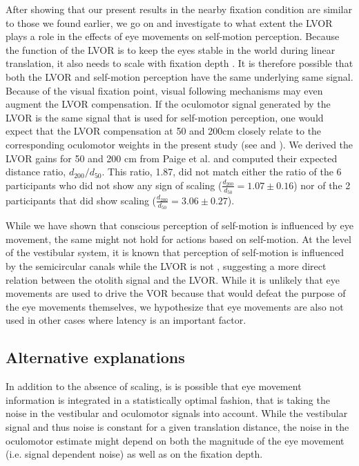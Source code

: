 After showing that our present results in the nearby fixation condition are similar to those we found earlier, we go on and investigate to what extent the LVOR plays a role in the effects of eye movements on self-motion perception. Because the function of the LVOR is to keep the eyes stable in the world during linear translation, it also needs to scale with fixation depth \cite{paige1989, busettini1994,paige1998}. It is therefore possible that both the LVOR and self-motion perception have the same underlying same signal. Because of the visual fixation point, visual following mechanisms may even augment the LVOR compensation. If the oculomotor signal generated by the LVOR is the same signal that is used for self-motion perception, one would expect that the LVOR compensation at 50 and 200cm closely relate to the corresponding oculomotor weights in the present study (see  and ). We derived the LVOR gains for 50 and 200 \si{\centi\metre} from Paige et al. \citeyear{paige1989} and computed their expected distance ratio, $d_{200} / d_{50}$. This ratio, 1.87, did not match either the ratio of the 6 participants who did not show any sign of scaling ($\frac{d_{200}}{d_{50}} = 1.07 \pm 0.16$) nor of the 2 participants that did show scaling ($\frac{d_{200}}{d_{50}} = 3.06 \pm 0.27$).

While we have shown that conscious perception of self-motion is influenced by eye movement, the same might not hold for actions based on self-motion. At the level of the vestibular system, it is known that perception of self-motion is influenced by the semicircular canals while the LVOR is not \cite{merfeld2005}, suggesting a more direct relation between the otolith signal and the LVOR. While it is unlikely that eye movements are used to drive the VOR because that would defeat the purpose of the eye movements themselves, we hypothesize that eye movements are also not used in other cases where latency is an important factor.


\subsection{Alternative explanations}

In addition to the absence of scaling, is is possible that eye movement information is integrated in a statistically optimal fashion, that is taking the noise in the vestibular and oculomotor signals into account. While the vestibular signal and thus noise is constant for a given translation distance, the noise in the oculomotor estimate might depend on both the magnitude of the eye movement (i.e. signal dependent noise) as well as on the  fixation depth.

